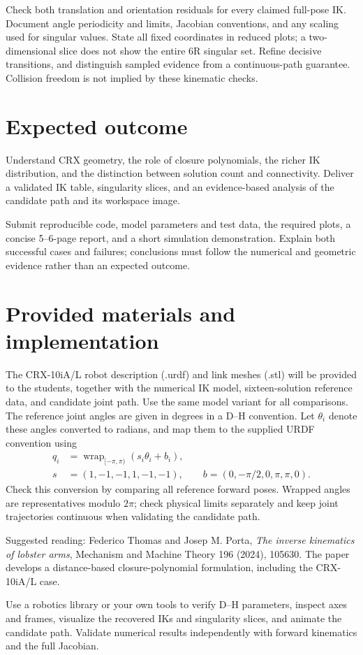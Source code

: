 \documentclass[11pt,a4paper]{article}
\begin{document}
Check both translation and orientation residuals
for every claimed full-pose IK. Document angle periodicity and limits,
Jacobian conventions, and any scaling used for singular values. State all
fixed coordinates in reduced plots; a two-dimensional slice does not show
the entire 6R singular set. Refine decisive transitions, and distinguish
sampled evidence from a continuous-path guarantee. Collision freedom is
not implied by these kinematic checks.

\section*{Expected outcome}
Understand CRX geometry, the role of closure polynomials, the richer IK
distribution, and the distinction between solution count and connectivity.
Deliver a validated IK table, singularity slices, and an evidence-based analysis
of the candidate path and its workspace image.

Submit reproducible code, model parameters and test data, the required plots,
a concise 5--6-page report, and a short simulation demonstration. Explain
both successful cases and failures; conclusions must follow the numerical
and geometric evidence rather than an expected outcome.

\section*{Provided materials and implementation}
The CRX-10iA/L robot description (.urdf) and link meshes (.stl) will be provided
to the students, together with the numerical IK model, sixteen-solution
reference data, and candidate joint path. Use the same model variant for all
comparisons. The reference joint angles are given in degrees in a D--H
convention. Let $\theta_i$ denote these angles converted to radians, and map
them to the supplied URDF convention using
\[
\begin{aligned}
q_i&=\operatorname{wrap}_{[-\pi,\pi)}(s_i\theta_i+b_i),\\
s&=(1,-1,-1,1,-1,-1),\qquad b=(0,-\pi/2,0,\pi,\pi,0).
\end{aligned}
\]
Check this conversion by comparing all reference forward poses. Wrapped angles
are representatives modulo $2\pi$; check physical limits separately and keep
joint trajectories continuous when validating the candidate path.

Suggested reading: Federico Thomas and Josep M. Porta,
\emph{The inverse kinematics of lobster arms},
Mechanism and Machine Theory 196 (2024), 105630. The paper develops a
distance-based closure-polynomial formulation, including the CRX-10iA/L case.

Use a robotics library or your own tools to verify D--H parameters, inspect
axes and frames, visualize the recovered IKs and singularity slices, and
animate the candidate path. Validate numerical results independently with
forward kinematics and the full Jacobian.
\end{document}
